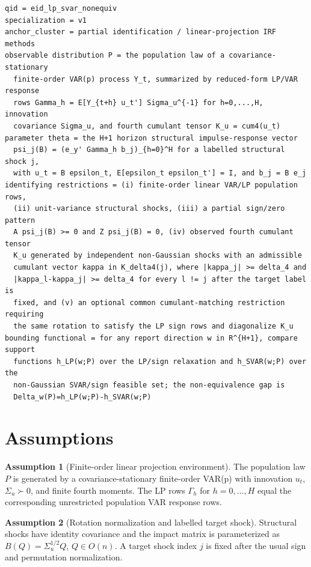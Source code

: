 \documentclass[11pt]{article}
\theoremstyle{definition}
\newtheorem{assumption}{Assumption}
\theoremstyle{plain}
\theoremstyle{remark}
\begin{document}
\begin{verbatim}
qid = eid_lp_svar_nonequiv
specialization = v1
anchor_cluster = partial identification / linear-projection IRF methods
observable distribution P = the population law of a covariance-stationary
  finite-order VAR(p) process Y_t, summarized by reduced-form LP/VAR response
  rows Gamma_h = E[Y_{t+h} u_t'] Sigma_u^{-1} for h=0,...,H, innovation
  covariance Sigma_u, and fourth cumulant tensor K_u = cum4(u_t)
parameter theta = the H+1 horizon structural impulse-response vector
  psi_j(B) = (e_y' Gamma_h b_j)_{h=0}^H for a labelled structural shock j,
  with u_t = B epsilon_t, E[epsilon_t epsilon_t'] = I, and b_j = B e_j
identifying restrictions = (i) finite-order linear VAR/LP population rows,
  (ii) unit-variance structural shocks, (iii) a partial sign/zero pattern
  A psi_j(B) >= 0 and Z psi_j(B) = 0, (iv) observed fourth cumulant tensor
  K_u generated by independent non-Gaussian shocks with an admissible
  cumulant vector kappa in K_delta4(j), where |kappa_j| >= delta_4 and
  |kappa_l-kappa_j| >= delta_4 for every l != j after the target label is
  fixed, and (v) an optional common cumulant-matching restriction requiring
  the same rotation to satisfy the LP sign rows and diagonalize K_u
bounding functional = for any report direction w in R^{H+1}, compare support
  functions h_LP(w;P) over the LP/sign relaxation and h_SVAR(w;P) over the
  non-Gaussian SVAR/sign feasible set; the non-equivalence gap is
  Delta_w(P)=h_LP(w;P)-h_SVAR(w;P)
\end{verbatim}

\section{Assumptions}
\begin{assumption}[Finite-order linear projection environment]\label{ass:finite-var}
The population law \(P\) is generated by a covariance-stationary finite-order VAR(p) with innovation \(u_t\), \(\Sigma_u\succ0\), and finite fourth moments.  The LP rows \(\Gamma_h\) for \(h=0,\ldots,H\) equal the corresponding unrestricted population VAR response rows.
\end{assumption}

\begin{assumption}[Rotation normalization and labelled target shock]\label{ass:normalization}
Structural shocks have identity covariance and the impact matrix is parameterized as \(B(Q)=\Sigma_u^{1/2}Q\), \(Q\in O(n)\).  A target shock index \(j\) is fixed after the usual sign and permutation normalization.
\end{assumption}
\end{document}
